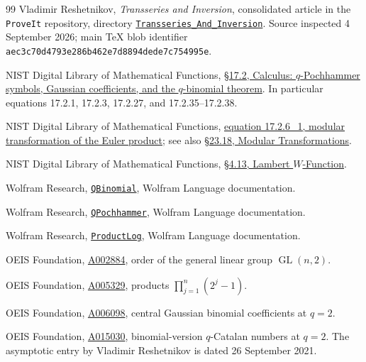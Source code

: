 \documentclass[11pt]{article}
\numberwithin{equation}{section}
\theoremstyle{definition}
\newcommand{\GL}{\operatorname{GL}}
\begin{document}
\begin{thebibliography}{99}
\small
{}
Vladimir Reshetnikov, \emph{Transseries and Inversion}, consolidated article in the
\texttt{ProveIt} repository, directory
\href{https://github.com/VladimirReshetnikov/ProveIt/tree/main/Analysis/FabiusFunction/docs/semi-formalized-research-frontiers/drafts/series-and-transseries/Transseries_And_Inversion}{\texttt{Transseries\_And\_Inversion}}.
Source inspected 4 September 2026; main TeX blob identifier
\texttt{aec3c70d4793e286b462e7d8894dede7c754995e}.

NIST Digital Library of Mathematical Functions,
\href{https://dlmf.nist.gov/17.2}{\S17.2, Calculus: $q$-Pochhammer symbols, Gaussian coefficients, and the $q$-binomial theorem}.
In particular equations 17.2.1, 17.2.3, 17.2.27, and 17.2.35--17.2.38.

NIST Digital Library of Mathematical Functions,
\href{https://dlmf.nist.gov/17.2.E6_1}{equation 17.2.6\_1, modular transformation of the Euler product};
see also \href{https://dlmf.nist.gov/23.18}{\S23.18, Modular Transformations}.

NIST Digital Library of Mathematical Functions,
\href{https://dlmf.nist.gov/4.13}{\S4.13, Lambert $W$-Function}.

Wolfram Research, \href{https://reference.wolfram.com/language/ref/QBinomial.html}{\texttt{QBinomial}}, Wolfram Language documentation.

Wolfram Research, \href{https://reference.wolfram.com/language/ref/QPochhammer.html}{\texttt{QPochhammer}}, Wolfram Language documentation.

Wolfram Research, \href{https://reference.wolfram.com/language/ref/ProductLog.html}{\texttt{ProductLog}}, Wolfram Language documentation.

OEIS Foundation, \href{https://oeis.org/A002884}{A002884}, order of the general linear group $\GL(n,2)$.

OEIS Foundation, \href{https://oeis.org/A005329}{A005329}, products $\prod_{j=1}^n(2^j-1)$.

OEIS Foundation, \href{https://oeis.org/A006098}{A006098}, central Gaussian binomial coefficients at $q=2$.

OEIS Foundation, \href{https://oeis.org/A015030}{A015030}, binomial-version $q$-Catalan numbers at $q=2$.
The asymptotic entry by Vladimir Reshetnikov is dated 26 September 2021.


\end{thebibliography}
\end{document}

